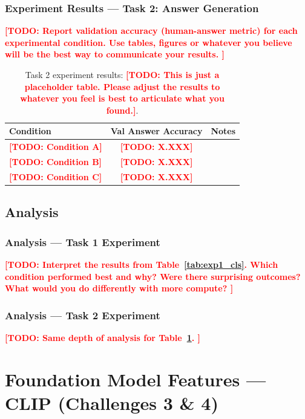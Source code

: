 \documentclass[11pt]{article}
\newcommand{\todo}[1]{\textcolor{red}{\textbf{[TODO: #1]}}}
\begin{document}
\subsubsection{Experiment Results — Task 2: Answer Generation}

\todo{
  Report validation accuracy (human-answer metric) for each experimental
  condition. Use tables, figures or whatever you believe will be the best way to communicate your results.
}

\begin{table}[h]
  \centering
  \caption{Task 2 experiment results: \todo{This is just a placeholder table. Please adjust the results to whatever you feel is best to articulate what you found.}.}
  \label{tab:exp1_gen}
  \begin{tabular}{lcc}
    \toprule
    \textbf{Condition} & \textbf{Val Answer Accuracy} & \textbf{Notes} \\
    \midrule
    \todo{Condition A}  & \todo{X.XXX}  & \\
    \todo{Condition B}  & \todo{X.XXX}  & \\
    \todo{Condition C}  & \todo{X.XXX}  & \\
    \bottomrule
  \end{tabular}
\end{table}

\subsection{Analysis}

\subsubsection{Analysis — Task 1 Experiment}
\todo{
  Interpret the results from Table~\ref{tab:exp1_cls}. Which condition
  performed best and why? Were there surprising outcomes? What would you
  do differently with more compute?
}

\subsubsection{Analysis — Task 2 Experiment}
\todo{
  Same depth of analysis for Table~\ref{tab:exp1_gen}.
}


\section{Foundation Model Features — CLIP (Challenges 3 \& 4)}
\end{document}
